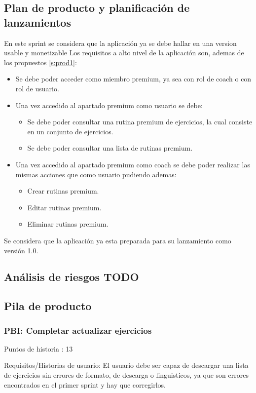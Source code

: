 \documentclass[11pt,a4paper]{report}
\begin{document}
\subsection{Plan de producto y planificación de lanzamientos}
En este sprint se considera que la aplicación ya se debe hallar en una version usable y monetizable 
\newline Los requisitos a alto nivel de la aplicación son, ademas de los propuestos \ref{s:prod1}:
\begin{itemize}
	\item Se debe poder acceder como miembro premium, ya sea con rol de coach o con rol de usuario.
	\item Una vez accedido al apartado premium como usuario se debe:
	\begin{itemize}
		\item Se debe poder consultar una rutina premium de ejercicios, la cual consiste en un conjunto de ejercicios.
		\item Se debe poder consultar una lista de rutinas premium.
	\end{itemize}
	\item Una vez accedido al apartado premium como coach se debe poder realizar las mismas acciones que como usuario pudiendo ademas:
	\begin{itemize}
		\item Crear rutinas premium.
		\item Editar rutinas premium.
		\item Eliminar rutinas premium.
	\end{itemize}
\end{itemize}
Se considera que la aplicación ya esta preparada para su lanzamiento como versión 1.0.
\subsection{Análisis de riesgos TODO}
\subsection{Pila de producto}
\subsubsection{PBI: Completar actualizar ejercicios}
Puntos de historia : 13

Requisitos/Historias de usuario: El usuario debe ser capaz de descargar una lista de ejercicios sin errores de formato, de descarga o linguisticos, ya que son errores encontrados en el primer sprint y hay que corregirlos.
\end{document}
